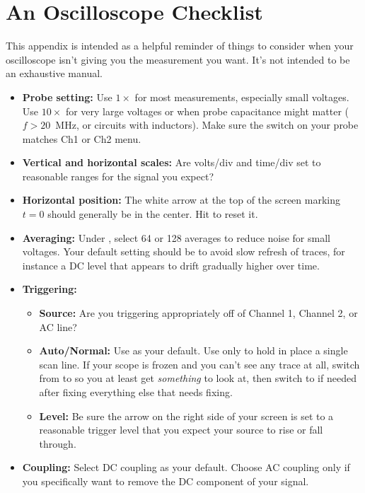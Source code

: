 \section{An Oscilloscope Checklist}
\label{oscilloscope_checklist}

This appendix is intended as a helpful reminder of things to consider when your oscilloscope isn't giving you the measurement you want.  It's not intended to be an exhaustive manual.

\begin{itemize}

\item \textbf{Probe setting:} Use $1\times$ for most measurements, especially small voltages.  Use $10\times$ for very large voltages or when probe capacitance might matter ($f > 20$~MHz, or circuits with inductors).  Make sure the switch on your probe matches Ch1 or Ch2 menu.

\item \textbf{Vertical and horizontal scales:} Are volts/div and time/div set to reasonable ranges for the signal you expect?

\item \textbf{Horizontal position:} The white arrow at the top of the screen marking $t=0$ should generally be in the center. Hit  to reset it. 

\item \textbf{Averaging:} Under , select 64 or 128 averages to reduce noise for small voltages.  Your default setting should be  to avoid slow refresh of traces, for instance a DC level that appears to drift gradually higher over time.

\item \textbf{Triggering:}

\begin{itemize}

\item \textbf{Source:} Are you triggering appropriately off of Channel 1, Channel 2, or AC line?

\item \textbf{Auto/Normal:} Use  as your default.  Use  only to hold in place a single scan line.  If your scope is frozen and you can't see any trace at all, switch from   to  so you at least get \textit{something} to look at, then switch to  if needed after fixing everything else that needs fixing.

\item \textbf{Level:} Be sure the arrow on the right side of your screen is set to a reasonable trigger level that you expect your source to rise or fall through.

\end{itemize}

\item \textbf{Coupling:} Select DC coupling as your default.  Choose AC coupling only if you specifically want to remove the DC component of your signal.
\end{itemize}
